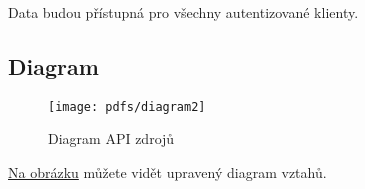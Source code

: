Data budou přístupná pro všechny autentizované klienty.

\subsection{Diagram}\label{diagram-1}

\begin{figure}
\centering
\texttt{[image: pdfs/diagram2]}
\caption{Diagram API zdrojů\label{pic:diagram2}}
\end{figure}

\protect\hyperlink{pic:diagram2}{Na obrázku} můžete vidět upravený diagram vztahů.
